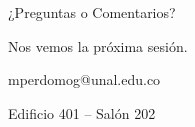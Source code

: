 \documentclass[aspectratio=169,xcolor=dvipsnames]{beamer}
\begin{document}
	\begin{frame}{¿Preguntas o Comentarios?}
		\begin{center}
			\vspace{0.5cm}
			\Large Nos vemos la próxima sesión.
			
			\vspace{0.8cm}
			\normalsize
			mperdomog@unal.edu.co
			
			\vspace{0.2cm}
			Edificio 401 -- Salón 202
		\end{center}
	\end{frame}
	
\end{document}
